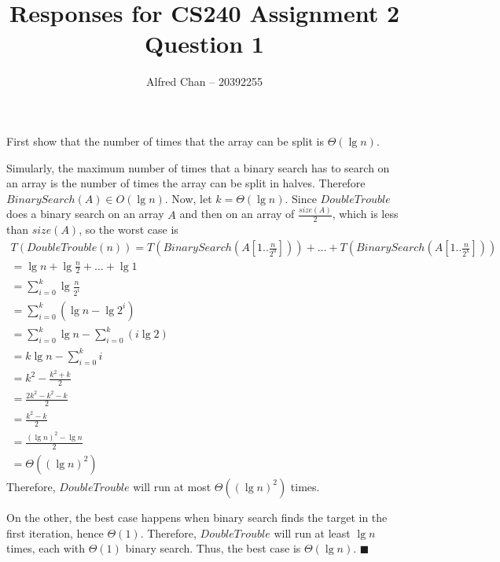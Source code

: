 \documentclass[12pt]{article}
\title{Responses for CS240 Assignment 2 Question 1}
\author{Alfred Chan -- 20392255}
\begin{document}
\maketitle
First show that the number of times that the array can be split is $\Theta(\lg n)$.

Simularly, the maximum number of times that a binary search has to search on an array is the number of times the array can be split in halves.
Therefore $BinarySearch(A) \in O(\lg n)$.
Now, let $k = \Theta(\lg n)$.
Since $DoubleTrouble$ does a binary search on an array $A$ and then on an array of $\frac{size(A)}{2}$, which is less than $size(A)$, so the worst case is
\begin{gather*}
T(DoubleTrouble(n)) = T(BinarySearch(A[1..\frac{n}{2^0}])) + \dots + T(BinarySearch(A[1 .. \frac{n}{2^k}]))\\
	= \lg n + \lg\frac{n}{2} + \dots + \lg 1\\
	= \sum_{i=0}^{k} \lg \frac{n}{2^i}\\
	= \sum_{i=0}^{k} (\lg n - \lg 2^{i})\\
	= \sum_{i=0}^{k} \lg n - \sum_{i=0}^{k} (i \lg 2)\\
	= k\lg n - \sum_{i=0}^{k} i\\
	= k^2 - \frac{k^2 + k}{2}\\
	= \frac{2k^2 - k^2 - k}{2}\\
	= \frac{k^2 - k}{2}\\
	= \frac{(\lg n)^2 - \lg n}{2}\\
	= \Theta((\lg n)^2)
\end{gather*}
Therefore, $DoubleTrouble$ will run at most $\Theta((\lg n)^2)$ times.

On the other, the best case happens when binary search finds the target in the first iteration, hence $\Theta(1)$.
Therefore, $DoubleTrouble$ will run at least $\lg n$ times, each with $\Theta(1)$ binary search.
Thus, the best case is $\Theta(\lg n)$.
\hfill $\blacksquare$
\end{document}
